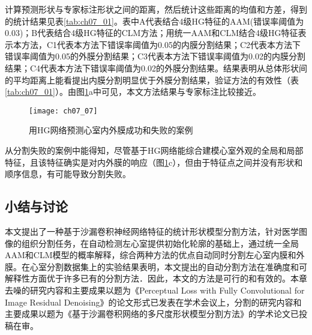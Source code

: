 计算预测形状与专家标注形状之间的距离，然后统计这些距离的均值和方差，得到的统计结果见表\ref{tab:ch07_01}。表中A代表结合4级HG特征的AAM(错误率阈值为0.03)；B代表结合4级HG特征的CLM方法；用统一AAM和CLM结合4级HG特征表示本方法，C1代表本方法下错误率阈值为0.05的内膜分割结果；C2代表本方法下错误率阈值为0.05的外膜分割结果；C3代表本方法下错误率阈值为0.02的内膜分割结果；C4代表本方法下错误率阈值为0.02的外膜分割结果。结果表明从总体形状间的平均距离上能看提出内膜分割明显优于外膜分割结果，验证方法的有效性（表\ref{tab:ch07_01}）。由图\ref{fig:ch07_07}a中可见，本文方法结果与专家标注比较接近。
\begin{figure}[!htbp]
\centering
\texttt{[image: ch07\_07]}
\caption{用HG网络预测心室内外膜成功和失败的案例}
\label{fig:ch07_07}
\end{figure}   

从分割失败的案例中能得知，尽管基于HG网络能综合建模心室外观的全局和局部特征，且该特征确实是对内外膜的响应（图\ref{fig:ch07_07}c），但由于特征点之间并没有形状和顺序信息，有可能导致分割失败。

\subsection{小结与讨论}

本文提出了一种基于沙漏卷积神经网络特征的统计形状模型分割方法，针对医学图像的组织分割任务，在自动检测左心室提供初始化轮廓的基础上，通过统一全局AAM和CLM模型的概率解释，综合两种方法的优点自动同时分割左心室内膜和外膜。在心室分割数据集上的实验结果表明，本文提出的自动分割方法在准确度和可解释性方面优于许多已有的分割方法．因此，本文的方法是可行的和有效的。本章去噪的研究内容和主要成果以题为《Perceptual Loss with Fully Convolutional for Image Residual Denoising》的论文形式已发表在学术会议上\citep{tao2018}，分割的研究内容和主要成果以题为《基于沙漏卷积网络的多尺度形状模型分割方法》的学术论文已投稿在审\cite{Pan2018}。

